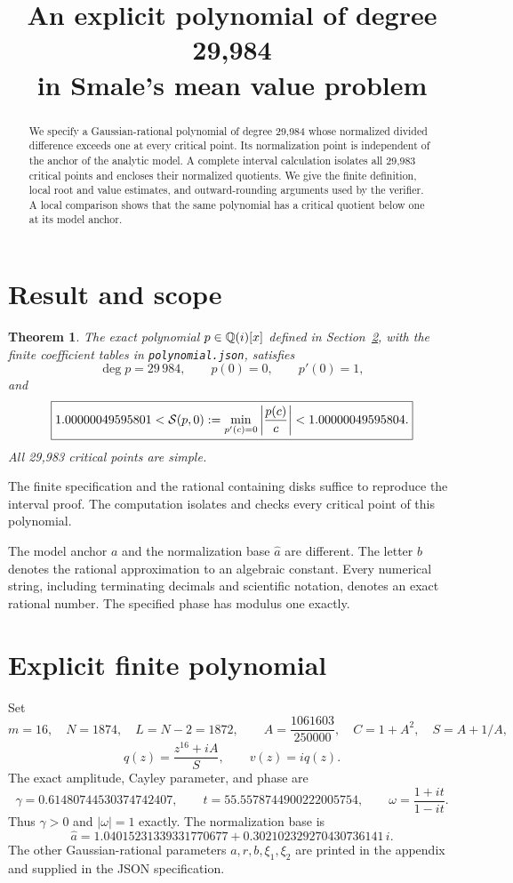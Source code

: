 \documentclass[11pt,a4paper]{article}
\title{An explicit polynomial of degree 29,984\\in Smale's mean value problem}
\author{}
\date{}
\newtheorem{theorem}{Theorem}\newtheorem{lemma}{Lemma}\newtheorem{proposition}{Proposition}
\newcommand{\abs}[1]{\left|#1\right|}
\newcommand{\file}[1]{\textnormal{\small\ttfamily\nolinkurl{#1}}}
\newcommand{\astar}{\widehat a}
\begin{document}
\maketitle
\begin{abstract}
We specify a Gaussian-rational polynomial of degree 29,984 whose normalized
divided difference exceeds one at every critical point. Its normalization
point is independent of the anchor of the analytic model. A complete interval
calculation isolates all 29,983 critical points and encloses their normalized
quotients. We give the finite definition, local root and value estimates,
and outward-rounding arguments used by the verifier. A local comparison
shows that the same polynomial has a critical quotient below one at its model
anchor.
\end{abstract}

\section{Result and scope}
\begin{theorem}\label{thm:result}
The exact polynomial $p\in\mathbb Q(i)[x]$ defined in Section~\ref{sec:definition},
with the finite coefficient tables in \file{polynomial.json}, satisfies
\[
 \deg p=29\,984,\qquad p(0)=0,\qquad p'(0)=1,
\]
and
\begin{equation}\label{eq:result}
 \boxed{\CertifiedLower<\Smal(p,0):=
 \min_{p'(c)=0}\abs{\frac{p(c)}c}<\CertifiedUpper.}
\end{equation}
All 29,983 critical points are simple. \UniquenessStatement
\end{theorem}

The finite specification and the rational containing disks suffice to reproduce
the interval proof. The computation isolates and checks every critical point
of this polynomial.

The model anchor $a$ and the normalization base $\astar$ are different.
The letter $b$ denotes the rational approximation to an algebraic constant.
Every numerical string, including terminating decimals and scientific
notation, denotes an exact rational number. The specified phase has modulus
one exactly.

\section{Explicit finite polynomial}\label{sec:definition}
Set
\[
 m=16,\quad N=1874,\quad L=N-2=1872,\qquad
 A=\frac{1061603}{250000},\quad C=1+A^2,\quad S=A+1/A,
\]
\[
 q(z)=\frac{z^{16}+iA}{S},\qquad v(z)=iq(z).
\]
The exact amplitude, Cayley parameter, and phase are
\[
 \gamma=0.61480744530374742407,\qquad t=55.5578744900222005754,\qquad
 \omega=\frac{1+it}{1-it}.
\]
Thus $\gamma>0$ and $|\omega|=1$ exactly. The normalization base is
\[
 \boxed{\astar=1.04015231339331770677+0.302102329270430736141\,i.}
\]
The other Gaussian-rational parameters $a,r,b,\xi_1,\xi_2$ are printed in the
appendix and supplied in the JSON specification.
\end{document}

